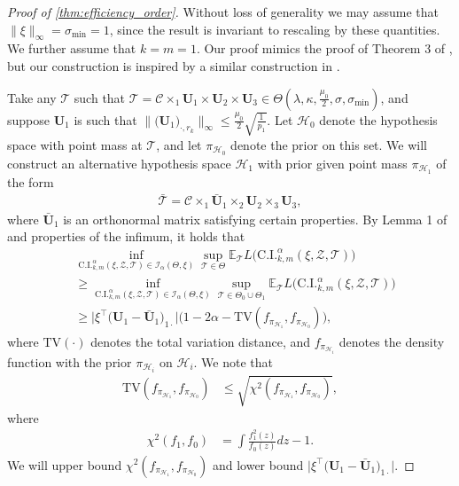 \documentclass[10pt]{article}
\newcommand{\0}{{\mathbf{0}}}
\newcommand{\1}{{\mathbf{1}}}
\newcommand{\U}{{\mathbf{U}}}
\renewcommand{\citet}{\cite}
\renewcommand{\t}{^{\top}}
\begin{document}
\begin{proof}[Proof of \cref{thm:efficiency_order}]
Without loss of generality we may  assume that $\|\xi\|_{\infty} = \sigma_{\min} = 1$, since the result is invariant to rescaling by these quantities.  We further assume that $k = m = 1$. Our proof mimics the proof of Theorem 3 of \citet{cai_confidence_2017}, but our construction is inspired by a similar construction in \citet{cheng_tackling_2021}.%

Take any $\mathcal{T}$ such that $\mathcal{T} = \mathcal{C} \times_1 \U_1 \times \U_2 \times \U_3 \in \Theta(\lambda,\kappa,\frac{\mu_0}{2},\sigma,\sigma_{\min})$, and suppose $\U_1$ is such that  $\| \big( \U_1 \big)_{\cdot, r_k} \|_{\infty} \leq \frac{\mu_0}{2}\sqrt{\frac{1}{p_1}}$. Let $\mathcal{H}_0$ denote the hypothesis space with point mass at $\mathcal{T}$, and let $\pi_{\mathcal{H}_0}$ denote the prior on this set.  We will construct an alternative hypothesis space $\mathcal{H}_1$ with prior given point mass $\pi_{\mathcal{H}_1}$ of the form
\begin{align*}
    \mathcal{\bar T} = \mathcal{C} \times_1 \mathbf{\bar U}_1 \times_2 \U_2 \times_3 \U_3,
\end{align*}
where $\mathbf{\bar U}_1$ is an orthonormal matrix satisfying certain properties.  By Lemma 1 of \citet{cai_confidence_2017} and properties of the infimum, it holds that 
\begin{align*}
&\inf_{\mathrm{C.I.}_{k,m}^{\alpha}(\xi,\mathcal{Z},\mathcal{T}) \in \mathcal{I}_{\alpha}(\Theta,\xi)} \sup_{\mathcal{T} \in \Theta} \mathbb{E}_{\mathcal{T}} L\big( \mathrm{C.I.}_{k,m}^{\alpha}(\xi,\mathcal{Z},\mathcal{T}) \big) \\ &\geq \inf_{\mathrm{C.I.}_{k,m}^{\alpha}(\xi,\mathcal{Z},\mathcal{T}) \in \mathcal{I}_{\alpha}(\Theta,\xi)} \sup_{\mathcal{T} \in \Theta_0 \cup \Theta_1} \mathbb{E}_{\mathcal{T}} L\big( \mathrm{C.I.}_{k,m}^{\alpha}(\xi,\mathcal{Z},\mathcal{T}) \big) \\
 &\geq \big| \xi\t \big( \mathbf{U}_1 - \mathbf{\bar U}_1 \big)_{1\cdot} \big| \big( 1 - 2\alpha - \mathrm{TV}(f_{\pi_{\mathcal{H}_1}}, f_{\pi_{\mathcal{H}_0}} ) \big),
\end{align*}
where $\mathrm{TV}(\cdot)$ denotes the total variation distance, and $f_{\pi_{\mathcal{H}_i}}$ denotes the density function with the prior $\pi_{\mathcal{H}_i}$ on $\mathcal{H}_i$. We note that
\begin{align*}
    \mathrm{TV}(f_{\pi_{\mathcal{H}_1}}, f_{\pi_{\mathcal{H}_0}} ) &\leq \sqrt{\chi^2(f_{\pi_{\mathcal{H}_1}}, f_{\pi_{\mathcal{H}_0}})}, 
\end{align*}
where
\begin{align*}
    \chi^2(f_1,f_0) &= \int \frac{f_1^2(z)}{f_0(z)} dz- 1.
\end{align*}
We will upper bound $\chi^2(f_{\pi_{\mathcal{H}_1}}, f_{\pi_{\mathcal{H}_0}})$ and lower bound  $\big| \xi\t \big( \mathbf{U}_1 - \mathbf{\bar U}_1 \big)_{1\cdot} \big|$.  %


\end{proof}
\end{document}
